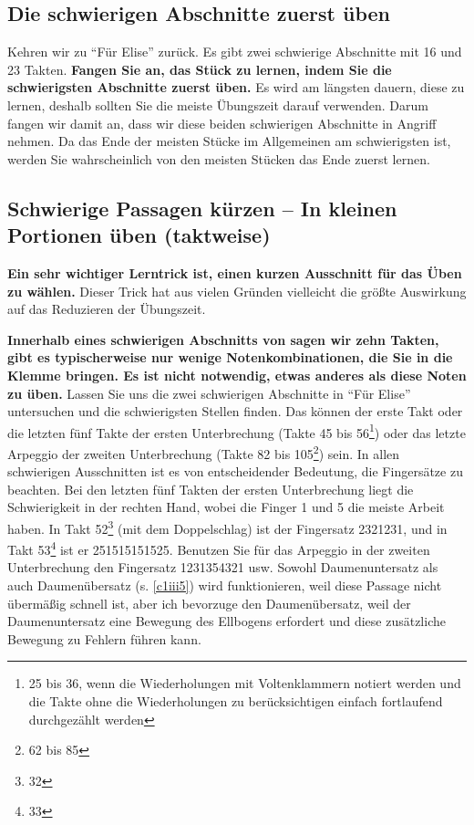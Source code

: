
\label{c1ii5}


\subsection{Die schwierigen Abschnitte zuerst üben}

Kehren wir zu \enquote{Für Elise} zurück.
Es gibt zwei schwierige Abschnitte mit 16 und 23 Takten.
\textbf{Fangen Sie an, das Stück zu lernen, indem Sie die schwierigsten Abschnitte zuerst üben.}
Es wird am längsten dauern, diese zu lernen, deshalb sollten Sie die meiste Übungszeit darauf verwenden.
Darum fangen wir damit an, dass wir diese beiden schwierigen Abschnitte in Angriff nehmen.
Da das Ende der meisten Stücke im Allgemeinen am schwierigsten ist, werden Sie wahrscheinlich von den meisten Stücken das Ende zuerst lernen.
 

\subsection{Schwierige Passagen kürzen -- In kleinen Portionen üben (taktweise)}
\label{c1ii6}

\textbf{Ein sehr wichtiger Lerntrick ist, einen kurzen Ausschnitt für das Üben zu wählen.}
Dieser Trick hat aus vielen Gründen vielleicht die größte Auswirkung auf das Reduzieren der Übungszeit.

\textbf{Innerhalb eines schwierigen Abschnitts von sagen wir zehn Takten, gibt es typischerweise nur wenige Notenkombinationen, die Sie in die Klemme bringen.
Es ist nicht notwendig, etwas anderes als diese Noten zu üben.}
Lassen Sie uns die zwei schwierigen Abschnitte in \enquote{Für Elise} untersuchen und die schwierigsten Stellen finden.
Das können der erste Takt oder die letzten fünf Takte der ersten Unterbrechung (Takte 45 bis 56\footnote{25 bis 36, wenn die Wiederholungen mit Voltenklammern notiert werden und die Takte ohne die Wiederholungen zu berücksichtigen einfach fortlaufend durchgezählt werden}) oder das letzte Arpeggio der zweiten Unterbrechung (Takte 82 bis 105\footnote{62 bis 85}) sein.
In allen schwierigen Ausschnitten ist es von entscheidender Bedeutung, die Fingersätze zu beachten.
Bei den letzten fünf Takten der ersten Unterbrechung liegt die Schwierigkeit in der rechten Hand, wobei die Finger 1 und 5 die meiste Arbeit haben.
In Takt 52\footnote{32} (mit dem Doppelschlag) ist der Fingersatz 2321231, und in Takt 53\footnote{33} ist er 251515151525.
Benutzen Sie für das Arpeggio in der zweiten Unterbrechung den Fingersatz 1231354321 usw.
Sowohl Daumenuntersatz als auch Daumenübersatz (s. \hyperref[c1iii5]{\autoref{c1iii5}}) wird funktionieren, weil diese Passage nicht übermäßig schnell ist, aber ich bevorzuge den Daumenübersatz, weil der Daumenuntersatz eine Bewegung des Ellbogens erfordert und diese zusätzliche Bewegung zu Fehlern führen kann.

